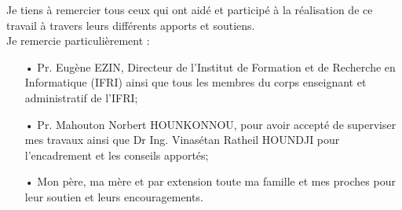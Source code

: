 \remerciements


     Je tiens à remercier tous ceux qui ont aidé et participé à la réalisation de ce travail à travers leurs différents apports et soutiens. \\
	\hspace*{.5cm}Je remercie particulièrement : \\
	\begin{itemize}
		\item[•] Pr. Eugène EZIN, Directeur de l'Institut de Formation et de Recherche en Informatique (IFRI) ainsi que tous les membres du corps enseignant et administratif de l'IFRI;
		\item[•] Pr. Mahouton Norbert HOUNKONNOU, pour avoir accepté de superviser mes travaux ainsi que Dr Ing. Vinasétan Ratheil HOUNDJI pour l'encadrement et les conseils apportés;
		\item[•] Mon père, ma mère et par extension toute ma famille et mes proches pour leur soutien et leurs encouragements. 
	\end{itemize}

